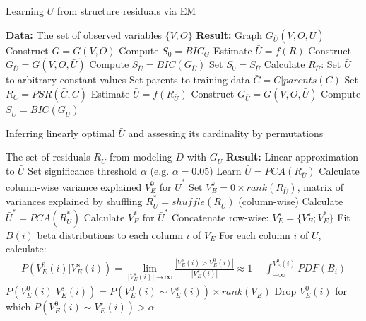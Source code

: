 \documentclass[letterpaper]{article}
\begin{document}
\begin{algorithm}%
 \caption{Learning $\bar{U}$ from structure residuals via EM}
 \label{alg:latentEM}
\begin{algorithmic}
 \State \textbf{Data:} The set of observed variables $\{V, O\}$
 \State \textbf{Result:} Graph $G_{\bar{U}}(V, O, \bar{U})$
 \State Construct $G = G(V, O)$\;
 \State Compute $S_0 = BIC_{G}$\;
 \State Estimate $\bar{U} = f(R)$\;
 \State Construct $G_{\bar{U}} = G(V, O, \bar{U})$\;
 \State Compute $S_{\bar{U}} = BIC(G_{\bar{U}})$\;
  \State Set $S_0 = S_{\bar{U}}$\;
  \State Calculate $R_{\bar{U}}$:\;
  \State Set $\bar{U}$ to arbitrary constant values\;
  	\State Set parents to training data\;
  	\State $\bar{C} = C|parents(C)$\;
  	\State Set $R_C = PSR(\bar{C}, C)$\;
  \EndFor
  \State Estimate $\bar{U} = f(R_{\bar{U}})$\;
  \State Construct $G_{\bar{U}} = G(V, O, \bar{U})$\;
  \State Compute $S_{\bar{U}} = BIC(G_{\bar{U}})$\;
 \EndWhile
\end{algorithmic}
\end{algorithm}
\hspace{1cm}
\begin{algorithm}%
 \caption{Inferring linearly optimal $\bar{U}$ and assessing its cardinality by permutations}
 \label{alg:linearPCA}
\begin{algorithmic}
 The set of residuals $R_{\bar{U}}$ from modeling $D$ with $G_{\bar{U}}$
\State \textbf{Result:} Linear approximation to $\bar{U}$
 \State Set significance threshold $\alpha$ (e.g. $\alpha = 0.05$)\;
 \State Learn $\bar{U} = PCA(R_{\bar{U}})$\;
 \State Calculate column-wise variance explained $V_E^{0}$ for $\bar{U}^{*}$\;
 \State Set $V_E^s = 0 \times rank(R_{\bar{U}})$, matrix of variances explained by shuffling\;
  \State $R_{\bar{U}}^{*} = shuffle(R_{\bar{U}})$ (column-wise)\;
  \State Calculate $\bar{U}^{*} = PCA(R_{\bar{U}}^{*})$\;
  \State Calculate $V_E^{*}$ for $\bar{U}^{*}$\;
  \State Concatenate row-wise: $V_E^s = \{V_E^s; V_E^{*}\}$\;
  \State Fit $B(i)$ beta distributions to each column $i$ of $V_E$\;
  \State For each column $i$ of $\bar{U}$, calculate:\;
  \begin{gather*}
  P(V_E^{0}(i) | V_E^s(i)) = \lim_{|V_E^s(i)| \to \infty} \frac{|V_E^s(i) > V_E^{0}(i)|}{|V_E^s(i)|} \approx 1 - \int_{-\infty}^{V_E^{0}(i)} PDF(B_i)
  \end{gather*}\;
 \EndWhile
 \State $P(V_E^{0}(i) | V_E^s(i)) = P(V_E^{0}(i) \sim V_E^s(i)) \times rank(V_E)$\;
 \State Drop $V_E^{0}(i)$ for which $P(V_E^{0}(i) \sim V_E^s(i)) > \alpha$
\end{algorithmic}
\end{algorithm}
\end{document}
